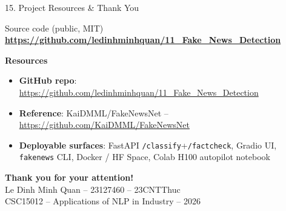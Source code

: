 \documentclass[10pt,aspectratio=169]{beamer}
\begin{document}
\begin{frame}{15. Project Resources \& Thank You}
\begin{block}{Source code (public, MIT)}
\centering
\large \textbf{\url{https://github.com/ledinhminhquan/11_Fake_News_Detection}}
\end{block}

\textbf{Resources}
\begin{itemize}\small
  \item \textbf{GitHub repo}: \scriptsize\url{https://github.com/ledinhminhquan/11_Fake_News_Detection}
  \item \textbf{Reference}: KaiDMML/FakeNewsNet -- \scriptsize\url{https://github.com/KaiDMML/FakeNewsNet}
  \item \textbf{Deployable surfaces}: FastAPI \texttt{/classify}+\texttt{/factcheck}, Gradio UI, \texttt{fakenews} CLI, Docker / HF Space, Colab H100 autopilot notebook
\end{itemize}

\vspace{0.3cm}
\centering
\Large\textbf{Thank you for your attention!}\\[0.2cm]
\normalsize Le Dinh Minh Quan -- 23127460 -- 23CNTThuc \\
\small CSC15012 -- Applications of NLP in Industry -- 2026
\end{frame}
\end{document}
